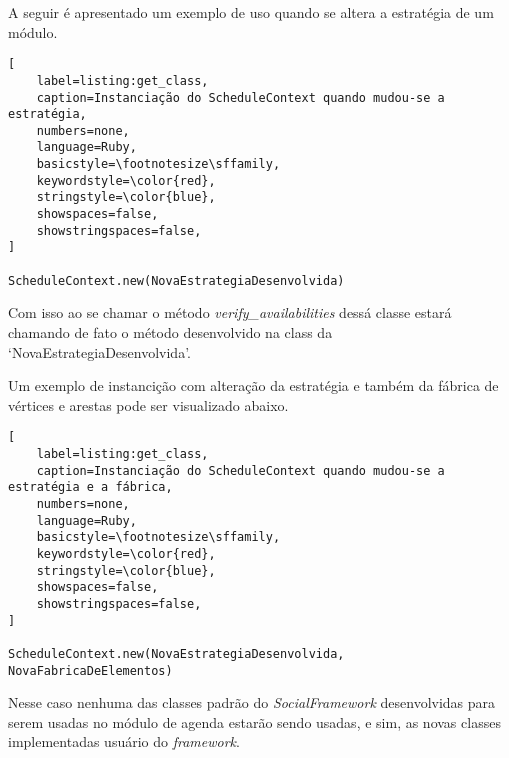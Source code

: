 A seguir é apresentado um exemplo de uso quando se altera a estratégia de um módulo.

\begin{lstlisting}[
    label=listing:get_class,
    caption=Instanciação do ScheduleContext quando mudou-se a estratégia,
    numbers=none,
    language=Ruby,
    basicstyle=\footnotesize\sffamily,
    keywordstyle=\color{red},
    stringstyle=\color{blue},
    showspaces=false,
    showstringspaces=false,
]

ScheduleContext.new(NovaEstrategiaDesenvolvida)
\end{lstlisting}

Com isso ao se chamar o método \textit{verify\_availabilities} dessá classe estará chamando de fato o método desenvolvido na class da `NovaEstrategiaDesenvolvida'.

Um exemplo de instancição com alteração da estratégia e também da fábrica de vértices e arestas pode ser visualizado abaixo.

\begin{lstlisting}[
    label=listing:get_class,
    caption=Instanciação do ScheduleContext quando mudou-se a estratégia e a fábrica,
    numbers=none,
    language=Ruby,
    basicstyle=\footnotesize\sffamily,
    keywordstyle=\color{red},
    stringstyle=\color{blue},
    showspaces=false,
    showstringspaces=false,
]

ScheduleContext.new(NovaEstrategiaDesenvolvida, NovaFabricaDeElementos)
\end{lstlisting}

Nesse caso nenhuma das classes padrão do \textit{SocialFramework} desenvolvidas para serem usadas no módulo de agenda estarão sendo usadas, e sim, as novas classes implementadas usuário do \textit{framework}.
